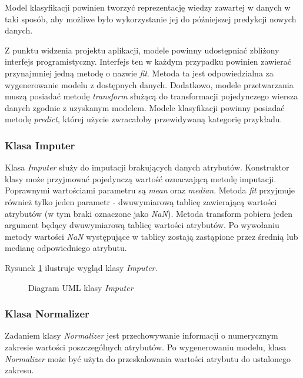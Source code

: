 \documentclass[../thesis.tex]{subfiles}
\begin{document}
Model klasyfikacji powinien tworzyć reprezentację wiedzy zawartej w danych w taki sposób, aby możliwe było wykorzystanie jej do późniejszej predykcji nowych danych.

Z punktu widzenia projektu aplikacji, modele powinny udostępniać zbliżony interfejs programistyczny. Interfejs ten w każdym przypadku powinien zawierać przynajmniej jedną metodę o nazwie \emph{fit}. Metoda ta jest odpowiedzialna za wygenerowanie modelu z dostępnych danych. Dodatkowo, modele przetwarzania muszą posiadać metodę \emph{transform} służącą do transformacji pojedynczego wiersza danych zgodnie z uzyskanym modelem. Modele klasyfikacji powinny posiadać metodę \emph{predict}, której użycie zwracałoby przewidywaną kategorię przykładu.

\subsubsection{Klasa Imputer}

Klasa \emph{Imputer} służy do imputacji brakujących danych atrybutów. Konstruktor klasy może przyjmować pojedynczą wartość oznaczającą metodę imputacji. Poprawnymi wartościami parametru są \emph{mean} oraz \emph{median}. Metoda \emph{fit} przyjmuje również tylko jeden parametr - dwuwymiarową tablicę zawierającą wartości atrybutów (w tym braki oznaczone jako \emph{NaN}). Metoda transform pobiera jeden argument będący dwuwymiarową tablicę wartości atrybutów. Po wywołaniu metody wartości \emph{NaN} występujące w tablicy zostają zastąpione przez średnią lub medianę odpowiedniego atrybutu. 

Rysunek \ref{proj:diagram_imputer} ilustruje wygląd klasy \emph{Imputer}.

\begin{figure}[h]
\centering
{}
\caption{Diagram UML klasy \emph{Imputer}}
\label{proj:diagram_imputer}
\end{figure}

\subsubsection{Klasa Normalizer}

Zadaniem klasy \emph{Normalizer} jest przechowywanie informacji o numerycznym zakresie wartości poszczególnych atrybutów. Po wygenerowaniu modelu, klasa \emph{Normalizer} może być użyta do przeskalowania wartości atrybutu do ustalonego zakresu. 
\end{document}
